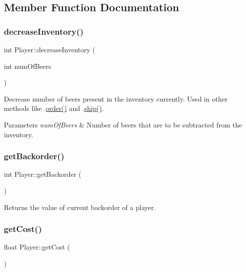 \subsection{Member Function Documentation}
\mbox{\label{classPlayer_ad7e72eebf5097d94027610f80ca0cb78}} 
\subsubsection{\texorpdfstring{decrease\+Inventory()}{decreaseInventory()}}
{\footnotesize\ttfamily int Player\+::decrease\+Inventory (\begin{DoxyParamCaption}\item[{int}]{num\+Of\+Beers }\end{DoxyParamCaption})}

Decrease number of beers present in the inventory currently. Used in other methods like .\hyperlink{classPlayer_a44d67418e9628bcebb094cb08d2b8645}{order()} and .\hyperlink{classPlayer_a99b3fcf7fa83e14419716b090892d6c8}{ship()}. 
\begin{DoxyParams}{Parameters}
{\em num\+Of\+Beers} & Number of beers that are to be subtracted from the inventory. \\
\hline
\end{DoxyParams}
\mbox{\label{classPlayer_a8080e44c26141d956babb824d2a7ae7c}} 
\subsubsection{\texorpdfstring{get\+Backorder()}{getBackorder()}}
{\footnotesize\ttfamily int Player\+::get\+Backorder (\begin{DoxyParamCaption}{ }\end{DoxyParamCaption})}

Returns the value of current backorder of a player. \mbox{\label{classPlayer_a0fd8247cc0326d8df1051bd83928cf2c}} 
\subsubsection{\texorpdfstring{get\+Cost()}{getCost()}}
{\footnotesize\ttfamily float Player\+::get\+Cost (\begin{DoxyParamCaption}{ }\end{DoxyParamCaption})}

